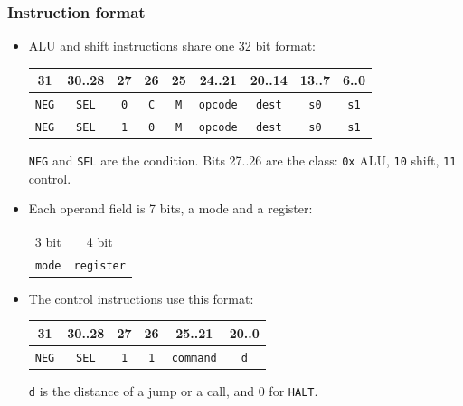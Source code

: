 \documentclass{beamer}
\newcommand{\code}[1]{\texttt{#1}}
\begin{document}
   \begin{frame}
    \frametitle{Instruction format}
    \begin{itemize}
     \item ALU and shift instructions share one 32 bit format:
      {\scriptsize
      \begin{center}
       \begin{tabular}{|c|c||c|c|c||c||c|c|c|}
        \hline
         31&30..28&27&26&25&24..21&20..14&13..7&6..0\\
        \hline
         \code{NEG}&\code{SEL}&\code{0}&\code{C}&\code{M}&\code{opcode}&\code{dest}&\code{s0}&\code{s1}\\
         \code{NEG}&\code{SEL}&\code{1}&\code{0}&\code{M}&\code{opcode}&\code{dest}&\code{s0}&\code{s1}\\
        \hline
       \end{tabular}
      \end{center}
      }
      \code{NEG} and \code{SEL} are the condition. Bits 27..26 are the
      class: \code{0x} ALU, \code{10} shift, \code{11} control.
     \item Each operand field is 7 bits, a mode and a register:
      \begin{center}
       \begin{tabular}{|c|c|}
        \hline
         3 bit&4 bit\\
         \code{mode}&\code{register}\\
        \hline
       \end{tabular}
      \end{center}
     \item The control instructions use this format:
      {\scriptsize
      \begin{center}
       \begin{tabular}{|c|c||c|c||c|c|}
        \hline
         31&30..28&27&26&25..21&20..0\\
        \hline
         \code{NEG}&\code{SEL}&\code{1}&\code{1}&\code{command}&\code{d}\\
        \hline
       \end{tabular}
      \end{center}
      }
      \code{d} is the distance of a jump or a call, and 0 for
      \code{HALT}.
    \end{itemize}
   \end{frame}
%
\end{document}
